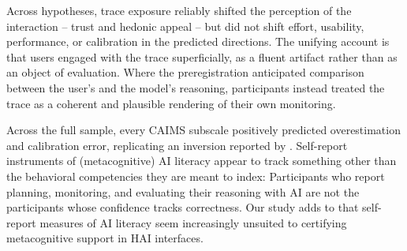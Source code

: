\documentclass[manuscript,review,anonymous]{acmart}
\begin{document}

Across hypotheses, trace exposure reliably shifted the perception of the interaction -- trust and hedonic appeal -- but did not shift effort, usability, performance, or calibration in the predicted directions. The unifying account is that users engaged with the trace superficially, as a fluent artifact rather than as an object of evaluation. Where the preregistration anticipated comparison between the user's and the model's reasoning, participants instead treated the trace as a coherent and plausible rendering of their own monitoring.

Across the full sample, every CAIMS subscale positively predicted overestimation and calibration error, replicating an inversion reported by \citet{FERNANDES2026108779}. Self-report instruments of (metacognitive) AI literacy appear to track something other than the behavioral competencies they are meant to index: Participants who report planning, monitoring, and evaluating their reasoning with AI are not the participants whose confidence tracks correctness. Our study adds to \citet{FERNANDES2026108779} that self-report measures of AI literacy seem increasingly unsuited to certifying metacognitive support in HAI interfaces.
\end{document}
